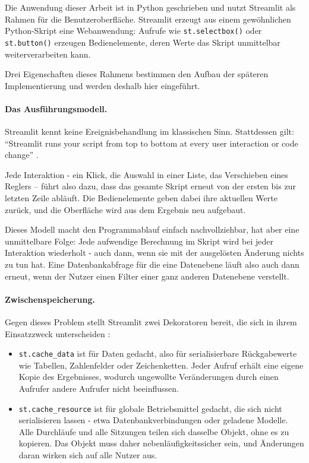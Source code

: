 \documentclass[12pt,a4paper]{report}
\begin{document}
Die Anwendung dieser Arbeit ist in Python geschrieben und nutzt Streamlit als Rahmen für
die Benutzeroberfläche. Streamlit erzeugt aus einem gewöhnlichen Python-Skript eine
Webanwendung: Aufrufe wie \texttt{st.selectbox()} oder \texttt{st.button()} erzeugen
Bedienelemente, deren Werte das Skript unmittelbar weiterverarbeiten kann.

Drei Eigenschaften dieses Rahmens bestimmen den Aufbau der späteren Implementierung und
werden deshalb hier eingeführt.

\paragraph{Das Ausführungsmodell.}

Streamlit kennt keine Ereignisbehandlung im klassischen Sinn. Stattdessen gilt:
\enquote{Streamlit runs your script from top to bottom at every user interaction or code
change} \cite{StreamlitCaching}.

Jede Interaktion - ein Klick, die Auswahl in einer Liste, das Verschieben eines Reglers --
führt also dazu, dass das gesamte Skript erneut von der ersten bis zur letzten Zeile
abläuft. Die Bedienelemente geben dabei ihre aktuellen Werte zurück, und die Oberfläche
wird aus dem Ergebnis neu aufgebaut.

Dieses Modell macht den Programmablauf einfach nachvollziehbar, hat aber eine unmittelbare
Folge: Jede aufwendige Berechnung im Skript wird bei jeder Interaktion wiederholt - auch
dann, wenn sie mit der ausgelösten Änderung nichts zu tun hat. Eine Datenbankabfrage für
die eine Datenebene läuft also auch dann erneut, wenn der Nutzer einen Filter einer ganz
anderen Datenebene verstellt.

\paragraph{Zwischenspeicherung.}

Gegen dieses Problem stellt Streamlit zwei Dekoratoren bereit, die sich in ihrem
Einsatzzweck unterscheiden \cite{StreamlitCaching}:

\begin{itemize}
    \item \texttt{st.cache\_data} ist für Daten gedacht, also für serialisierbare
    Rückgabewerte wie Tabellen, Zahlenfelder oder Zeichenketten. Jeder Aufruf erhält eine
    eigene Kopie des Ergebnisses, wodurch ungewollte Veränderungen durch einen Aufrufer
    andere Aufrufer nicht beeinflussen.
    \item \texttt{st.cache\_resource} ist für globale Betriebsmittel gedacht, die sich
    nicht serialisieren lassen - etwa Datenbankverbindungen oder geladene Modelle. Alle
    Durchläufe und alle Sitzungen teilen sich dasselbe Objekt, ohne es zu kopieren. Das
    Objekt muss daher nebenläufigkeitssicher sein, und Änderungen daran wirken sich auf
    alle Nutzer aus.
\end{itemize}
\end{document}
